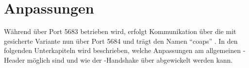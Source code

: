 \chapter{Anpassungen}
\label{chp:anpassungen}

Während  über Port 5683 betrieben wird, erfolgt Kommunikation über die mit  gesicherte Variante nun
über Port 5684 und trägt den Namen "`coaps"' \cite{portnumbers}. In den folgenden Unterkapiteln wird beschrieben, welche
Anpassungen am allgemeinen -Header möglich sind und wie der -Handshake über  abgewickelt
werden kann.


